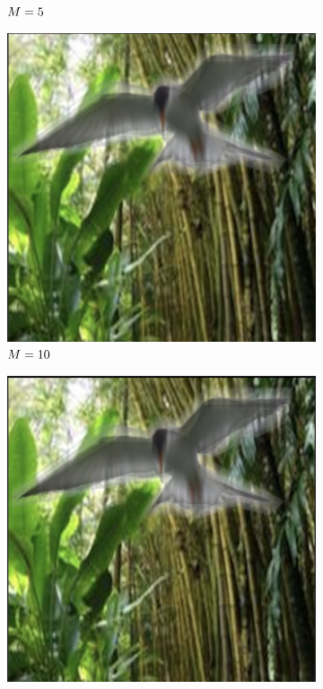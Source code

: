 \begin{figure}[!t]
\begin{subfigure}[b]{0.19\textwidth}
  \caption{$M = 5$}
  \label{fig:motion_blur_5}
\end{subfigure}
\begin{subfigure}[b]{0.19\textwidth}
  \includegraphics[width=0.99\linewidth]{plotsAistats/motion_blur_10.png}
  \caption{$M = 10$}
  \label{fig:motion_blur_10}
\end{subfigure}
\begin{subfigure}[b]{0.19\textwidth}
  \includegraphics[width=0.99\linewidth]{plotsAistats/motion_blur_15.png}

\end{subfigure}
\end{figure}
